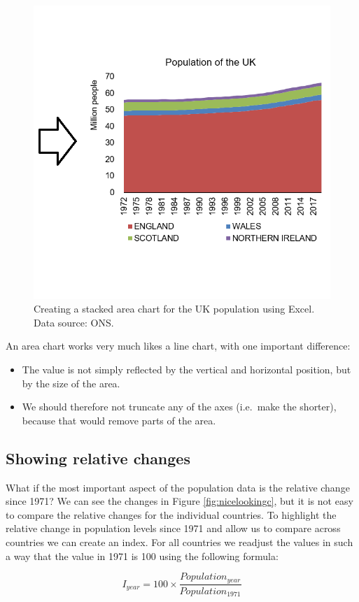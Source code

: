 \documentclass[]{book}
\providecommand{\tightlist}{%
  \setlength{\itemsep}{0pt}\setlength{\parskip}{0pt}}
\begin{document}
\begin{figure}

{\centering \includegraphics[width=0.5\linewidth]{_resources/chapter_people/stacked} 

}

\caption{Creating a stacked area chart for the UK population  using Excel. Data source: ONS.}\label{fig:stacked}
\end{figure}

An area chart works very much likes a line chart, with one important difference:

\begin{itemize}
\tightlist
\item
  The value is not simply reflected by the vertical and horizontal position, but by the size of the area.
\item
  We should therefore not truncate any of the axes (i.e.~make the shorter), because that would remove parts of the area.
\end{itemize}

\hypertarget{showing-relative-changes}{%
\subsection{Showing relative changes}\label{showing-relative-changes}}

What if the most important aspect of the population data is the relative change since 1971? We can see the changes in Figure \ref{fig:nicelookingc}, but it is not easy to compare the relative changes for the individual countries. To highlight the relative change in population levels since 1971 and allow us to compare across countries we can create an index. For all countries we readjust the values in such a way that the value in 1971 is 100 using the following formula:

\[ I_{year}=100\times \frac{Population_{year}}{Population_{1971}}\]
\end{document}
